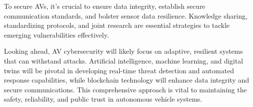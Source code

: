To secure AVs, it's crucial to ensure data integrity, establish secure communication standards, and bolster sensor data resilience.
Knowledge sharing, standardizing protocols, and joint research are essential strategies to tackle emerging vulnerabilities effectively.

Looking ahead, AV cybersecurity will likely focus on adaptive, resilient systems that can withstand attacks.
Artificial intelligence, machine learning, and digital twins will be pivotal in developing real-time threat detection and automated response capabilities,
while blockchain technology will enhance data integrity and secure communications.
This comprehensive approach is vital to maintaining the safety, reliability, and public trust in autonomous vehicle systems.